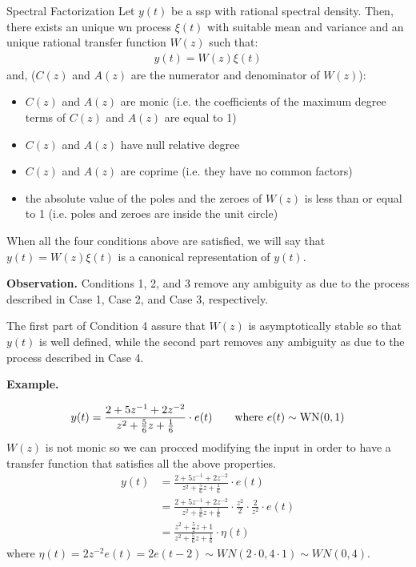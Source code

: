 
\begin{theorem}{Spectral Factorization}
	Let $y(t)$ be a \gls{ssp} with rational spectral density. 
	Then, there exists an unique \gls{wn} process $\xi(t)$ with suitable mean and variance and an unique rational transfer function $W(z)$ such that:
	\begin{align*}
		y(t) = W(z)\xi(t)
	\end{align*}
    and, ($C(z)$ and $A(z)$ are the numerator and denominator of $W(z)$):
    \begin{itemize}
		\item $C(z)$ and $A(z)$ are monic (i.e. the coefficients of the maximum degree terms of $C(z)$ and $A(z)$ are equal to 1)
		\item $C(z)$ and $A(z)$ have null relative degree
		\item $C(z)$ and $A(z)$ are coprime (i.e. they have no common factors) 
		\item the absolute value of the poles and the zeroes of $W(z)$ is less than or equal to 1 (i.e. poles and zeroes are inside the unit circle)
    \end{itemize}
\end{theorem}

When all the four conditions above are satisfied, we will say that $y(t) = W(z)\xi(t)$ is a canonical representation of $y(t)$.

\textbf{Observation.} Conditions 1, 2, and 3 remove any ambiguity as due to the process described in Case 1, Case 2, and Case 3, respectively. 

The first part of Condition 4 assure that $W(z)$ is asymptotically stable so that $y(t)$ is well defined, while the second part removes any ambiguity as due to the process described in Case 4.

\textbf{Example.}

\begin{align*}
	y(t)=\frac{2+5z^{-1}+2z^{-2}}{z^2+\frac{5}{6}z+\frac{1}{6}}\cdot e(t)  \qquad \text{where } e(t)\sim \operatorname{WN}(0,1)
\end{align*}
$W(z)$ is not monic so we can procced modifying the input in order to have a transfer function that satisfies all the above properties.
\begin{align*}
	y(t)&=\frac{2+5z^{-1}+2z^{-2}}{z^2+\frac{5}{6}z+\frac{1}{6}}\cdot e(t) \\
	&=\frac{2+5z^{-1}+2z^{-2}}{z^2+\frac{5}{6}z+\frac{1}{6}}\cdot\frac{z^2}{2}\cdot\frac{2}{z^2}\cdot e(t)\\
	&=\frac{z^2+\frac{5}{2}z+1}{z^2+\frac{5}{6}z+\frac{1}{6}}\cdot \eta(t)
\end{align*}
where $\eta(t)=2z^{-2}e(t)=2e(t-2)\sim WN(2\cdot0,4\cdot1)\sim WN(0,4)$.

